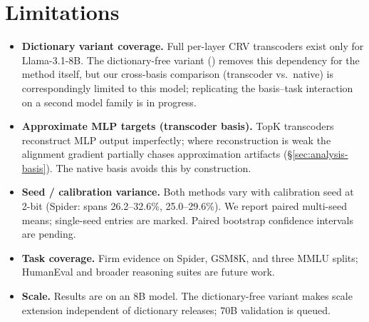 \section{Limitations}
\label{sec:limitations}

\begin{itemize}
  \item \textbf{Dictionary variant coverage.} Full per-layer CRV transcoders
        exist only for Llama-3.1-8B. The dictionary-free variant
        (\methodfree{}) removes this dependency for the method itself, but our
        cross-basis comparison (transcoder vs.\ native) is correspondingly
        limited to this model; replicating the basis--task interaction on a
        second model family is in progress.
  \item \textbf{Approximate MLP targets (transcoder basis).} TopK transcoders
        reconstruct MLP output imperfectly; where reconstruction is weak the
        alignment gradient partially chases approximation artifacts
        (\S\ref{sec:analysis-basis}). The native basis avoids this by
        construction.
  \item \textbf{Seed / calibration variance.} Both methods vary with
        calibration seed at 2-bit (Spider: \method{} spans 26.2--32.6\%, \baseline{}
        25.0--29.6\%). We report paired multi-seed means; single-seed entries
        are marked. Paired bootstrap confidence intervals are pending.
  \item \textbf{Task coverage.} Firm evidence on Spider, GSM8K, and three MMLU
        splits; HumanEval and broader reasoning suites are future work.
  \item \textbf{Scale.} Results are on an 8B model. The dictionary-free
        variant makes scale extension independent of dictionary releases;
        70B validation is queued.
\end{itemize}
